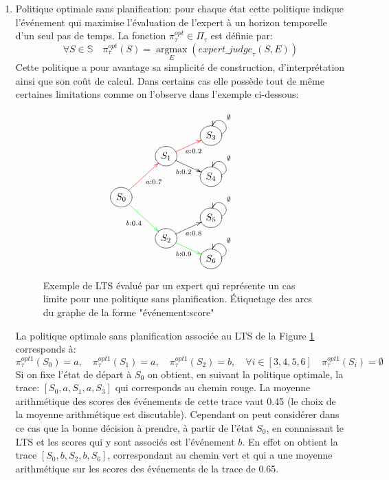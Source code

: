 \documentclass[11pt]{extarticle}
\DeclareMathOperator*{\argmax}{argmax}
\begin{document}
 \begin{enumerate}
     \item Politique optimale sans planification: pour chaque état cette politique indique l'événement qui maximise l'évaluation de l'expert à un horizon temporelle d'un seul pas de temps.  La fonction $\pi_\tau^{opt}\in \Pi_\tau$ est définie par:
     \begin{equation}\label{pi_instan}
            \forall S\in \mathds{S} \quad \pi^{opt}_\tau(S) = \underset{E}{\argmax} (expert\_{judge}_\tau(S,E))
     \end{equation}
     Cette politique a pour avantage sa simplicité de construction, d'interprétation ainsi que son coût de calcul. Dans certains cas elle possède tout de même certaines limitations comme on l'observe dans l'exemple ci-dessous:

     \begin{figure}[h!]
            \[
                \xymatrix @R=0.1em{
                    & &  *++[o][F-]{S_3}\ar@(r,u)[]_{\emptyset} &
                \\  & *++[o][F-]{S_1} \ar@[red][ru]_{a: 0.2} \ar[rd]_{b: 0.2}&     
                \\  & & *++[o][F-]{S_4}\ar@(r,u)[]_{\emptyset} &
                \\  *++[o][F-]{S_0} \ar@[red][ruu]_{a: 0.7} \ar@[green][rdd]_{b: 0.4}& &   
                \\  & & *++[o][F-]{S_5} \ar@(r,u)[]_{\emptyset} &   
                \\  & *++[o][F-]{S_2} \ar[ru]_{a: 0.8} \ar@[green][rd]_{b: 0.9}&     
                \\  & & *++[o][F-]{S_6}\ar@(r,u)[]_{\emptyset} &
                }
            \]
            \captionsetup{width=0.8\textwidth}
         \centering
            \caption{Exemple de LTS évalué par un expert qui représente un cas limite pour une politique sans planification. Étiquetage des arcs du graphe de la forme "événement:score"}
         \label{fig:instant_cas_lim}
     \end{figure}
     La politique optimale sans planification associée au LTS de la Figure \ref{fig:instant_cas_lim} corresponds à:
     \begin{equation}
         \pi_\tau^{opt1}(S_0)=a,\quad \pi_\tau^{opt1}(S_1)=a,\quad \pi_\tau^{opt1}(S_2)=b,\quad \forall i\in[3,4,5,6]\quad  \pi^{opt1}_\tau(S_i)=\emptyset
     \end{equation}
    Si on fixe l'état de départ à $S_0$ on obtient, en suivant la politique optimale, la trace: $[S_0, a, S_1,a,S_3]$ qui corresponds au chemin rouge. La moyenne arithmétique des scores des événements de cette trace vaut 0.45 (le  choix de la moyenne arithmétique est discutable). Cependant on peut considérer dans ce cas que la bonne décision à prendre, à partir de l'état $S_0$, en connaissant le LTS et les scores qui y sont associés est l'événement $b$. En effet on obtient la trace $[S_0,b,S_2,b,S_6]$, correspondant au chemin vert et qui a une moyenne arithmétique sur les scores des événements de la trace de 0.65. 
    

\end{enumerate}
\end{document}
